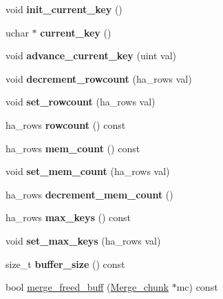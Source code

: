 \begin{DoxyCompactItemize}
\item 
\mbox{\label{structMerge__chunk_a11b1dcbd3e51cfd3aea12f2a98e05362}} 
void {\bfseries init\+\_\+current\+\_\+key} ()
\item 
\mbox{\label{structMerge__chunk_a54d3d48a5de08264daae37ad7ac9d018}} 
uchar $\ast$ {\bfseries current\+\_\+key} ()
\item 
\mbox{\label{structMerge__chunk_a38af044d804282eaec291ec3073c8d70}} 
void {\bfseries advance\+\_\+current\+\_\+key} (uint val)
\item 
\mbox{\label{structMerge__chunk_a8816c70a38ab46bf12763f8d8b6c4a4a}} 
void {\bfseries decrement\+\_\+rowcount} (ha\+\_\+rows val)
\item 
\mbox{\label{structMerge__chunk_ac4b687ef7ca31edaee2f04093651784d}} 
void {\bfseries set\+\_\+rowcount} (ha\+\_\+rows val)
\item 
\mbox{\label{structMerge__chunk_a6fba46cbde70da3aea538426659b400e}} 
ha\+\_\+rows {\bfseries rowcount} () const
\item 
\mbox{\label{structMerge__chunk_a3e14d978832ff9125f1a8a90ee213a4d}} 
ha\+\_\+rows {\bfseries mem\+\_\+count} () const
\item 
\mbox{\label{structMerge__chunk_a34460826afecb6f99d36b571a61c1b7c}} 
void {\bfseries set\+\_\+mem\+\_\+count} (ha\+\_\+rows val)
\item 
\mbox{\label{structMerge__chunk_abe2ddc66e9ca5433006505c4d6dc1852}} 
ha\+\_\+rows {\bfseries decrement\+\_\+mem\+\_\+count} ()
\item 
\mbox{\label{structMerge__chunk_aceb2b08cef9c0b84e8943dda4039bfa2}} 
ha\+\_\+rows {\bfseries max\+\_\+keys} () const
\item 
\mbox{\label{structMerge__chunk_a59422a83634c0b4cdaabc592f4bad4c9}} 
void {\bfseries set\+\_\+max\+\_\+keys} (ha\+\_\+rows val)
\item 
\mbox{\label{structMerge__chunk_aca3208b5a3ced89b3dc2c82791f69c10}} 
size\+\_\+t {\bfseries buffer\+\_\+size} () const
\item 
bool \mbox{\hyperlink{structMerge__chunk_a16cbac8e4ee4b057a77268ab65b54c12}{merge\+\_\+freed\+\_\+buff}} (\mbox{\hyperlink{structMerge__chunk}{Merge\+\_\+chunk}} $\ast$mc) const
\end{DoxyCompactItemize}


